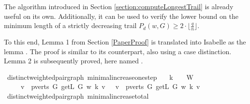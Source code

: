 \begin{isabellebody}
{\isafoldproof}%
%
\isadelimproof
%
\endisadelimproof
%
\isadelimdocument
%
\endisadelimdocument
%
\isatagdocument
%
\isamarkuptrue%
%
\endisatagdocument
{\isafolddocument}%
%
\isadelimdocument
%
\endisadelimdocument
%
\isadelimproof
%
\endisadelimproof
%
\isatagproof
%
\endisatagproof
{\isafoldproof}%
%
\isadelimproof
%
\endisadelimproof
%
\begin{isamarkuptext}%
\label{section:minLength}
The algorithm introduced in Section \ref{section:computeLongestTrail} is already useful on its own. Additionally, it can be
used to verify the lower bound on the minimum length of a strictly decreasing trail $P_d(w,G) \ge 2 \cdot \lfloor \frac{q}{n} \rfloor$.

To this end, Lemma 1 from Section \ref{PaperProof} is translated into Isabelle as the lemma
. The proof is 
similar to its counterpart, also using a case distinction. Lemma 2 is subsequently proved, here
named .%
\end{isamarkuptext}\isamarkuptrue%
\isamarkupfalse%
{\isacharparenleft}\ distinct{\isacharunderscore}weighted{\isacharunderscore}pair{\isacharunderscore}graph{\isacharparenright}\ minimal{\isacharunderscore}increase{\isacharunderscore}one{\isacharunderscore}step{\isacharcolon}\isanewline
\ \ \ {\isachardoublequoteopen}k\ {\isacharplus}\ {}\ {\isasymin}\ W{\isachardoublequoteclose}\isanewline
\ \ \ \isanewline
\ \ \ \ {\isachardoublequoteopen}{\isacharparenleft}{\isasymSum}\ v\ {\isasymin}\ pverts\ G{\isachardot}\ getL\ G\ w\ {\isacharparenleft}k{\isacharplus}{}{\isacharparenright}\ v{\isacharparenright}\ {\isasymge}\ {\isacharparenleft}{\isasymSum}\ v\ {\isasymin}\ pverts\ G{\isachardot}\ getL\ G\ w\ k\ v{\isacharparenright}\ {\isacharplus}\ {}{\isachardoublequoteclose}\ \isanewline
%
\isadelimproof
%
\endisadelimproof
%
\isatagproof
%
\endisatagproof
{\isafoldproof}%
%
\isadelimproof
%
\endisadelimproof
%
\isadelimproof
%
\endisadelimproof
%
\isatagproof
%
\endisatagproof
{\isafoldproof}%
%
\isadelimproof
\isanewline
%
\endisadelimproof
{}\isamarkupfalse%
{\isacharparenleft}\ distinct{\isacharunderscore}weighted{\isacharunderscore}pair{\isacharunderscore}graph{\isacharparenright}\ minimal{\isacharunderscore}increase{\isacharunderscore}total{\isacharcolon}\isanewline

\end{isabellebody}
